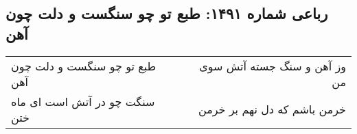 \begin{center}
\section*{رباعی شماره ۱۴۹۱: طبع تو چو سنگست و دلت چون آهن}
\label{sec:1491}
\begin{longtable}{l p{0.5cm} r}
طبع تو چو سنگست و دلت چون آهن
&&
وز آهن و سنگ جسته آتش سوی من
\\
سنگت چو در آتش است ای ماه ختن
&&
خرمن باشم که دل نهم بر خرمن
\\
\end{longtable}
\end{center}
